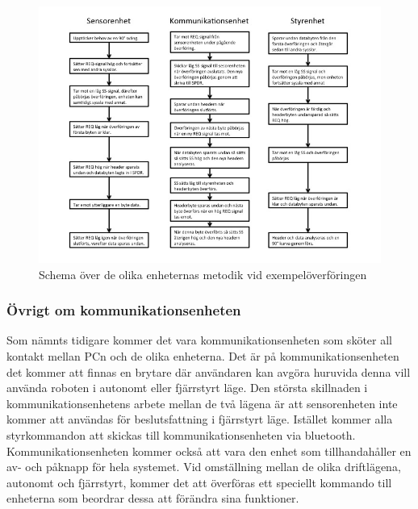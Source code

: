 \begin{figure}[H]
 \centering
\includegraphics[angle=0,scale=0.7]{bilder/schema_exempel.jpg}
  \caption{Schema över de olika enheternas metodik vid exempelöverföringen}
  \label{fig:schema}
\end{figure}

\subsubsection{Övrigt om kommunikationsenheten}

Som nämnts tidigare kommer det vara kommunikationsenheten som sköter all kontakt mellan PCn och de olika enheterna. Det är på kommunikationsenheten det kommer att finnas en brytare där användaren kan avgöra huruvida denna vill använda roboten i autonomt eller fjärrstyrt läge. Den största skillnaden i kommunikationsenhetens arbete mellan de två lägena är att sensorenheten inte kommer att användas för beslutsfattning i fjärrstyrt läge. Istället kommer alla styrkommandon att skickas till kommunikationsenheten via bluetooth. Kommunikationsenheten kommer också att vara den enhet som tillhandahåller en av- och påknapp för hela systemet.
Vid omställning mellan de olika driftlägena, autonomt och fjärrstyrt, kommer det att överföras ett speciellt kommando till enheterna som beordrar dessa att förändra sina funktioner.  

